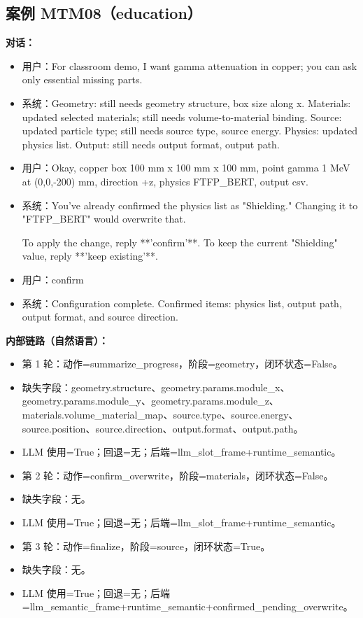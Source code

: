 \documentclass[11pt]{ctexart}
\begin{document}
\subsection{案例 MTM08（education）}
\textbf{对话：}
\begin{itemize}
\item 用户：For classroom demo, I want gamma attenuation in copper; you can ask only essential missing parts.
\item 系统：Geometry: still needs geometry structure, box size along x. Materials: updated selected materials; still needs volume-to-material binding. Source: updated particle type; still needs source type, source energy. Physics: updated physics list. Output: still needs output format, output path.
\item 用户：Okay, copper box 100 mm x 100 mm x 100 mm, point gamma 1 MeV at (0,0,-200) mm, direction +z, physics FTFP\_BERT, output csv.
\item 系统：You've already confirmed the physics list as "Shielding." Changing it to "FTFP\_BERT" would overwrite that.

To apply the change, reply **'confirm'**.  
To keep the current "Shielding" value, reply **'keep existing'**.
\item 用户：confirm
\item 系统：Configuration complete. Confirmed items: physics list, output path, output format, and source direction.
\end{itemize}
\textbf{内部链路（自然语言）：}
\begin{itemize}
\item 第 1 轮：动作=summarize\_progress，阶段=geometry，闭环状态=False。
\item 缺失字段：geometry.structure、geometry.params.module\_x、geometry.params.module\_y、geometry.params.module\_z、materials.volume\_material\_map、source.type、source.energy、source.position、source.direction、output.format、output.path。
\item LLM 使用=True；回退=无；后端=llm\_slot\_frame+runtime\_semantic。
\item 第 2 轮：动作=confirm\_overwrite，阶段=materials，闭环状态=False。
\item 缺失字段：无。
\item LLM 使用=True；回退=无；后端=llm\_slot\_frame+runtime\_semantic。
\item 第 3 轮：动作=finalize，阶段=source，闭环状态=True。
\item 缺失字段：无。
\item LLM 使用=True；回退=无；后端=llm\_semantic\_frame+runtime\_semantic+confirmed\_pending\_overwrite。
\end{itemize}
\end{document}
